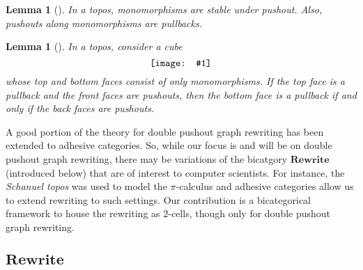 \documentclass[11pt]{amsart}
\newcommand{\cat}[1]{\mathbf{#1}}
\newcommand{\diagram}[1]{\raisebox{-0.5\height}{\texttt{[image: \#1]}}}
\newtheorem{lem}[thm]{Lemma}
\theoremstyle{remark}
\theoremstyle{definition}
\begin{document}
\begin{lem}[{\cite[Lemmas 
		4.2-3]{LackSoboc_AdhesiveCategories}}]
	\label{lem.adhesive properties}
	In a topos, monomorphisms are stable under 	pushout. Also, pushouts along monomorphisms 
	are pullbacks.
\end{lem}
%
%
%
%
%
%

\begin{lem}[{\cite[Lemma 
		6.3]{LackSoboc_AdhesiveCategories}}] 
	\label{lem.vk dual}
	In a topos, consider a cube
	\[
		\label{NoRef_AdhsiveDualCube}
		\diagram{NoRef_AdhsiveDualCube}
	\]
	whose top and bottom faces consist of only monomorphisms. If the top face is a pullback 
	and the front faces are pushouts, then the bottom face is a pullback if and only if the 
	back faces are pushouts.
\end{lem}

A good portion of the theory for double pushout graph rewriting has been extended to adhesive categories. So, while our focus is and will be on double pushout graph rewriting, there may be variations of the bicatgory $\cat{Rewrite}$ (introduced below) that are of interest to computer scientists.  For instance, the \emph{Schanuel topos} was used to model the $\pi$-calculus \cite{Fiore_OpModelsProcessCalulii} and adhesive categories allow  us to extend rewriting to such settings.  Our contribution is a bicategorical framework to house the rewriting as $2$-cells, though only for double pushout graph rewriting.

\subsection{$\cat{Rewrite}$}  %
\label{sec.Rewrite}
\end{document}
